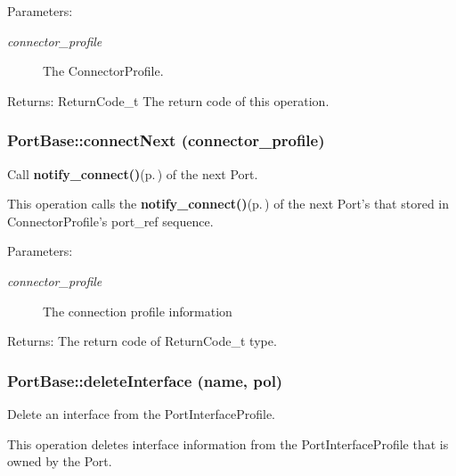 \begin{Desc}
\item[Parameters:]
\begin{description}
\item[{\em connector\_\-profile}]The Connector\-Profile. \end{description}
\end{Desc}
\begin{Desc}
\item[Returns:]Return\-Code\_\-t The return code of this operation.\end{Desc}
\subsubsection{\setlength{\rightskip}{0pt plus 5cm}Port\-Base::connect\-Next (connector\_\-profile)}\label{classPortBase_PortBasea15}


Call {\bf notify\_\-connect()}{\rm (p.\,\pageref{classPortBase_PortBasea6})} of the next Port. 

This operation calls the {\bf notify\_\-connect()}{\rm (p.\,\pageref{classPortBase_PortBasea6})} of the next Port's that stored in Connector\-Profile's port\_\-ref sequence.

\begin{Desc}
\item[Parameters:]
\begin{description}
\item[{\em connector\_\-profile}]The connection profile information \end{description}
\end{Desc}
\begin{Desc}
\item[Returns:]The return code of Return\-Code\_\-t type.\end{Desc}
\subsubsection{\setlength{\rightskip}{0pt plus 5cm}Port\-Base::delete\-Interface (name, pol)}\label{classPortBase_PortBasea26}


Delete an interface from the Port\-Interface\-Profile. 

This operation deletes interface information from the Port\-Interface\-Profile that is owned by the Port.

